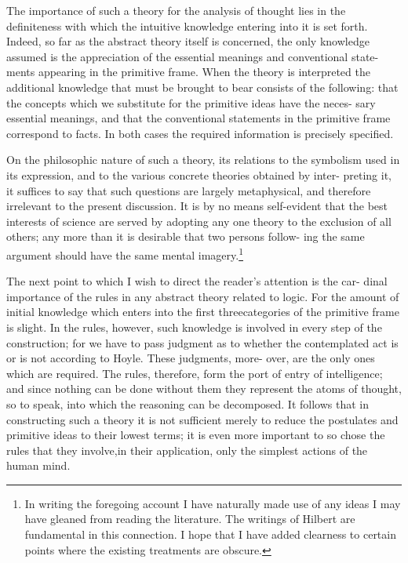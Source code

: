 \documentclass[10pt, twoside]{extarticle}
\theoremstyle{breaktheorem}
\theoremstyle{mylemma}
\theoremstyle{mydefinition}
\theoremstyle{mycorollary}
\begin{document}
The importance of such a theory for the analysis of thought lies in the
definiteness with which the intuitive knowledge entering into it is set forth.
Indeed, so far as the abstract theory itself is concerned, the only knowledge
assumed is the appreciation of the essential meanings and conventional state-
ments appearing in the primitive frame. When the theory is interpreted the
additional knowledge that must be brought to bear consists of the following:
that the concepts which we substitute for the primitive ideas have the neces-
sary essential meanings, and that the conventional statements in the primitive
frame correspond to facts. In both cases the required information is precisely
specified.

On the philosophic nature of such a theory, its relations to the symbolism
used in its expression, and to the various concrete theories obtained by inter-
preting it, it suffices to say that such questions are largely metaphysical, and
therefore irrelevant to the present discussion. It is by no means self-evident
that the best interests of science are served by adopting any one theory to the
exclusion of all others; any more than it is desirable that two persons follow-
ing the same argument should have the same mental imagery.\footnote{In writing the foregoing account I have naturally made use of any ideas I may have gleaned from reading the literature. The writings of Hilbert are fundamental in this connection. I hope that I have added clearness to certain points where the existing treatments are obscure.}

The next point to which I wish to direct the reader's attention is the car-
dinal importance of the rules in any abstract theory related to logic. For the
amount of initial knowledge which enters into the first threecategories of the
primitive frame is slight. In the rules, however, such knowledge is involved
in every step of the construction; for we have to pass judgment as to whether
the contemplated act is or is not according to Hoyle. These judgments, more-
over, are the only ones which are required. The rules, therefore, form the
port of entry of intelligence; and since nothing can be done without them
they represent the atoms of thought, so to speak, into which the reasoning
can be decomposed. It follows that in constructing such a theory it is not
sufficient merely to reduce the postulates and primitive ideas to their lowest
terms; it is even more important to so chose the rules that they involve,in
their application, only the simplest actions of the human mind.
\end{document}

